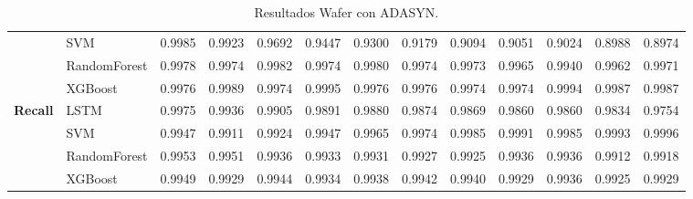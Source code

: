 \begin{table}[h]
\begin{adjustbox}{max width=15cm}
\begin{tabular}{|c|l|r|r|r|r|r|r|r|r|r|r|r|}
			& SVM &  0.9985 &  0.9923 &  0.9692 &  0.9447 &  0.9300 &  0.9179 &  0.9094 &  0.9051 &  0.9024 &  0.8988 &  0.8974 \\
			& RandomForest &  0.9978 &  0.9974 &  0.9982 &  0.9974 &  0.9980 &  0.9974 &  0.9973 &  0.9965 &  0.9940 &  0.9962 &  0.9971 \\
			& XGBoost &  0.9976 &  0.9989 &  0.9974 &  0.9995 &  0.9976 &  0.9976 &  0.9974 &  0.9974 &  0.9994 &  0.9987 &  0.9987 \\
			\hline
			\textbf{Recall} & LSTM &  0.9975 &  0.9936 &  0.9905 &  0.9891 &  0.9880 &  0.9874 &  0.9869 &  0.9860 &  0.9860 &  0.9834 &  0.9754 \\
			& SVM &  0.9947 &  0.9911 &  0.9924 &  0.9947 &  0.9965 &  0.9974 &  0.9985 &  0.9991 &  0.9985 &  0.9993 &  0.9996 \\
			& RandomForest &  0.9953 &  0.9951 &  0.9936 &  0.9933 &  0.9931 &  0.9927 &  0.9925 &  0.9936 &  0.9936 &  0.9912 &  0.9918 \\
			& XGBoost &  0.9949 &  0.9929 &  0.9944 &  0.9934 &  0.9938 &  0.9942 &  0.9940 &  0.9929 &  0.9936 &  0.9925 &  0.9929 \\
			\hline
		\end{tabular}
	\end{adjustbox}
	\caption{Resultados Wafer con ADASYN.}
	\label{tab:Wafer_ADASYN}
\end{table}

